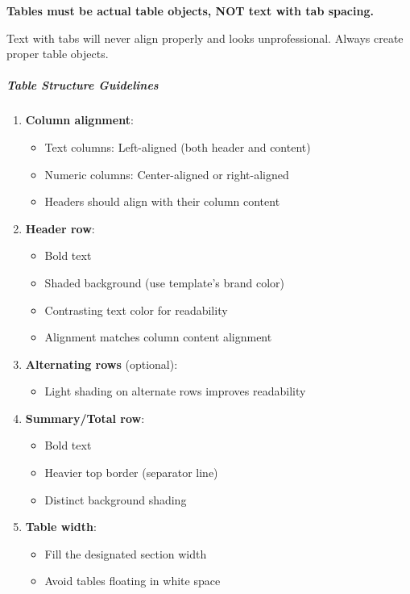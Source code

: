\documentclass[11pt]{article}
\begin{document}
\textbf{Tables must be actual table objects, NOT text with tab spacing.}


Text with tabs will never align properly and looks unprofessional. Always create proper table objects.


\subparagraph{Table Structure Guidelines}\mbox{}\par

\begin{enumerate}[leftmargin=*,itemsep=2pt,topsep=2pt]
\item {} \textbf{Column alignment}:
\begin{itemize}[leftmargin=*,itemsep=2pt,topsep=2pt]
\item {} Text columns: Left-aligned (both header and content)
\item {} Numeric columns: Center-aligned or right-aligned
\item {} Headers should align with their column content
\end{itemize}
\item {} \textbf{Header row}:
\begin{itemize}[leftmargin=*,itemsep=2pt,topsep=2pt]
\item {} Bold text
\item {} Shaded background (use template's brand color)
\item {} Contrasting text color for readability
\item {} Alignment matches column content alignment
\end{itemize}
\item {} \textbf{Alternating rows} (optional):
\begin{itemize}[leftmargin=*,itemsep=2pt,topsep=2pt]
\item {} Light shading on alternate rows improves readability
\end{itemize}
\item {} \textbf{Summary/Total row}:
\begin{itemize}[leftmargin=*,itemsep=2pt,topsep=2pt]
\item {} Bold text
\item {} Heavier top border (separator line)
\item {} Distinct background shading
\end{itemize}
\item {} \textbf{Table width}:
\begin{itemize}[leftmargin=*,itemsep=2pt,topsep=2pt]
\item {} Fill the designated section width
\item {} Avoid tables floating in white space
\end{itemize}
\end{enumerate}
\end{document}
